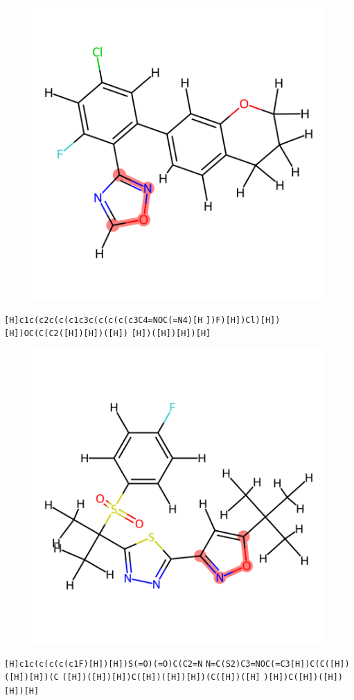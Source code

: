 \documentclass{article}
\begin{document}
\begin{figure}[ht]
\centering
    \includegraphics{mol88.png}
\end{figure}
\verb|[H]c1c(c2c(c(c1c3c(c(c(c(c3C4=NOC(=N4)[H| \verb|])F)[H])Cl)[H])[H])OC(C(C2([H])[H])([H])| \verb|[H])([H])[H])[H]|

\begin{figure}[ht]
\centering
    \includegraphics{mol89.png}
\end{figure}
\verb|[H]c1c(c(c(c(c1F)[H])[H])S(=O)(=O)C(C2=N| \verb|N=C(S2)C3=NOC(=C3[H])C(C([H])([H])[H])(C| \verb|([H])([H])[H])C([H])([H])[H])(C([H])([H]| \verb|)[H])C([H])([H])[H])[H]|
\end{document}
